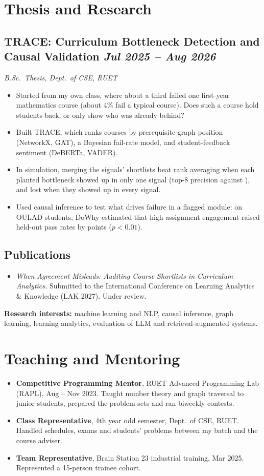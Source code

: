 \documentclass[10pt, a4paper]{article}
\newcommand{\datedsubsection}[2]{\needspace{8\baselineskip}\subsection*{#1 \hfill \small\textit{#2}}}
\newcommand{\resitem}[1]{\item #1}
\begin{document}
\section{Thesis and Research}

\datedsubsection{TRACE: Curriculum Bottleneck Detection and Causal Validation}{Jul 2025 -- Aug 2026}
\textit{B.Sc.\ Thesis, Dept.\ of CSE, RUET}
\begin{itemize}
    \resitem{Started from my own class, where about a third failed one first-year mathematics course (about 4\% fail a typical course). Does such a course hold students back, or only show who was already behind?}
    \resitem{Built TRACE, which ranks courses by prerequisite-graph position (NetworkX, GAT), a Bayesian fail-rate model, and student-feedback sentiment (DeBERTa, VADER).}
    \resitem{In simulation, merging the signals' shortlists beat rank averaging when each planted bottleneck showed up in only one signal (top-8 precision \factLakMerge{} against \factLakAverage{}), and lost when they showed up in every signal.}
    \resitem{Used causal inference to test what drives failure in a flagged module: on \factTraceStudents{} OULAD students, DoWhy estimated that high assignment engagement raised held-out pass rates by \factTraceEffect{} points ($p<0.01$).}
\end{itemize}

\subsection*{Publications}
\begin{itemize}
    \resitem{\textit{When Agreement Misleads: Auditing Course Shortlists in Curriculum Analytics.} Submitted to the International Conference on Learning Analytics \& Knowledge (LAK 2027). Under review.}
\end{itemize}

\textbf{Research interests:} machine learning and NLP, causal inference, graph learning, learning analytics, evaluation of LLM and retrieval-augmented systems.

\section{Teaching and Mentoring}
\begin{itemize}
    \resitem{\textbf{Competitive Programming Mentor}, RUET Advanced Programming Lab (RAPL), Aug -- Nov 2023. Taught number theory and graph traversal to junior students, prepared the problem sets and ran biweekly contests.}
    \resitem{\textbf{Class Representative}, 4th year odd semester, Dept.\ of CSE, RUET. Handled schedules, exams and students' problems between my batch and the course adviser.}
    \resitem{\textbf{Team Representative}, Brain Station 23 industrial training, Mar 2025. Represented a 15-person trainee cohort.}
\end{itemize}
\end{document}

